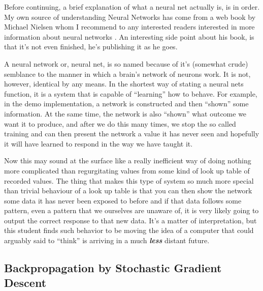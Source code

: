 \documentclass[a4paper,10pt]{article}
\let\oldemph\emph
\renewcommand{\emph}[1]{\textbf{\oldemph{#1}}}
\begin{document}
Before continuing, a brief explanation of what a neural net actually is, is in order.  My own source of understanding
Neural Networks has come from a web book by Michael Nielsen whom I recommend to any
interested readers interested in more information about neural networks \cite{NetWeb}. An interesting side point
about his book, is that it's not even finished, he's publishing it as he goes.

A neural network or, neural net, is so named because of it's (somewhat crude) semblance to the manner in which a brain's
network of neurons work.  It is not, however, identical by any means.  In the shortest way of stating a neural nets
function, it is a system that is capable of ``learning'' how to behave.  For example, in the demo implementation, a
network is constructed and then ``shown'' some information.  At the same time, the network is also ``shown'' what
outcome we want it to produce, and after we do this many times, we stop the so called training and can then present the 
network a value it has never seen and hopefully it will have learned to respond in the way we have taught it.

Now this may sound at the surface like a really inefficient way of doing nothing more complicated than regurgitating
values from some kind of look up table of recorded values.  The thing that makes this type of system so much more
special than trivial behaviour of a look up table is that you can then show the network some data it has never been
exposed to before and if that data follows some pattern, even a pattern that we ourselves are unaware of, it is very
likely going to output the correct response to that new data.  It's a matter of interpretation, but this student finds
such behavior to be moving the idea of a computer that could arguably said to ``think'' is arriving in a much
\emph{less} distant future.

\subsection{Backpropagation by Stochastic Gradient Descent}
\end{document}
